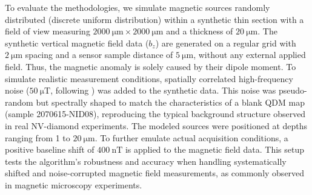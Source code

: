 To evaluate the methodologies, we simulate magnetic sources randomly distributed (discrete uniform distribution) within a synthetic thin section with a field of view measuring \( \qty{2000}{\micro\meter} \times \qty{2000}{\micro\meter} \) and a thickness of \( \qty{20}{\micro\meter} \). The synthetic vertical magnetic field data (\(b_z\)) are generated on a regular grid with \(\qty{2}{\micro\meter}\) spacing and a sensor sample distance of \(\qty{5}{\micro\meter}\), without any external applied field. Thus, the magnetic anomaly is solely caused by their dipole moment. To simulate realistic measurement conditions, spatially correlated high-frequency noise (\(\qty{50}{\micro\tesla}\), following \citet{Glenn2017}) was added to the synthetic data. This noise was pseudo-random but spectrally shaped to match the characteristics of a blank QDM map (sample 2070615-NID08), reproducing the typical background structure observed in real NV-diamond experiments. The modeled sources were positioned at depths ranging from 1 to \(\qty{20}{\micro\meter}\). To further emulate actual acquisition conditions, a positive baseline shift of \(\qty{400}{\nano\tesla}\) \citep[following][]{Hess2024} is applied to the magnetic field data. This setup tests the algorithm's robustness and accuracy when handling systematically shifted and noise-corrupted magnetic field measurements, as commonly observed in magnetic microscopy experiments.

